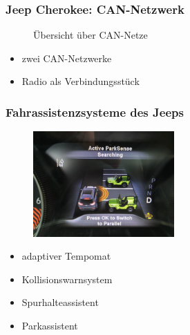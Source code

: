 \documentclass[t]{beamer}
\begin{document}
\begin{frame}
	\frametitle{Jeep Cherokee: CAN-Netzwerk}
    \begin{figure}
        \caption{Übersicht über CAN-Netze}
	\end{figure}
    \begin{itemize}
		\item zwei CAN-Netzwerke
        \item Radio als Verbindungsstück
	\end{itemize}
\end{frame}

\begin{frame}
    \frametitle{Fahrassistenzsysteme des Jeeps}
    \begin{figure}
        \includegraphics[width=0.48\textwidth]{pic/jeep_parkass.png}
        \caption{}
    \end{figure}
    \begin{itemize}
        \item adaptiver Tempomat
        \item Kollisionswarnsystem
        \item Spurhalteassistent
        \item Parkassistent
    \end{itemize}
\end{frame}
\end{document}
